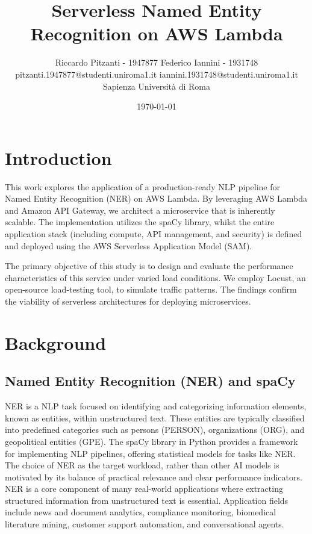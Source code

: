 \documentclass[11pt,a4paper]{article}
\title{\vspace{-1.5em}\Large\bfseries Serverless Named Entity Recognition on AWS Lambda}
\author{Riccardo Pitzanti - 1947877 \quad \quad \quad \quad Federico Iannini - 1931748\\
  \normalsize pitzanti.1947877@studenti.uniroma1.it \quad iannini.1931748@studenti.uniroma1.it\\[0.25em]
  \normalsize Sapienza Università di Roma}
\date{\normalsize \today}
\begin{document}
\maketitle
\vspace{-1.5em}

\section{Introduction}
This work explores the application of a production-ready NLP pipeline for Named Entity Recognition (NER) on AWS Lambda. By leveraging AWS Lambda and Amazon API Gateway, we architect a microservice that is inherently scalable. The implementation utilizes the spaCy library, whilst the entire application stack (including compute, API management, and security) is defined and deployed using the AWS Serverless Application Model (SAM).

The primary objective of this study is to design and evaluate the performance characteristics of this service under varied load conditions. We employ Locust, an open-source load-testing tool, to simulate traffic patterns. The findings confirm the viability of serverless architectures for deploying microservices.

\section{Background}

\subsection{Named Entity Recognition (NER) and spaCy}
NER is a NLP task focused on identifying and categorizing information elements, known as entities, within unstructured text. These entities are typically classified into predefined categories such as persons (\textsf{PERSON}), organizations (\textsf{ORG}), and geopolitical entities (\textsf{GPE}). The spaCy library in Python provides a framework for implementing NLP pipelines, offering statistical models for tasks like NER.
The choice of NER as the target workload, rather than other AI models is motivated by its balance of practical relevance and clear performance indicators. NER is a core component of many real-world applications where extracting structured information from unstructured text is essential. Application fields include news and document analytics, compliance monitoring, biomedical literature mining, customer support automation, and conversational agents.
\end{document}
